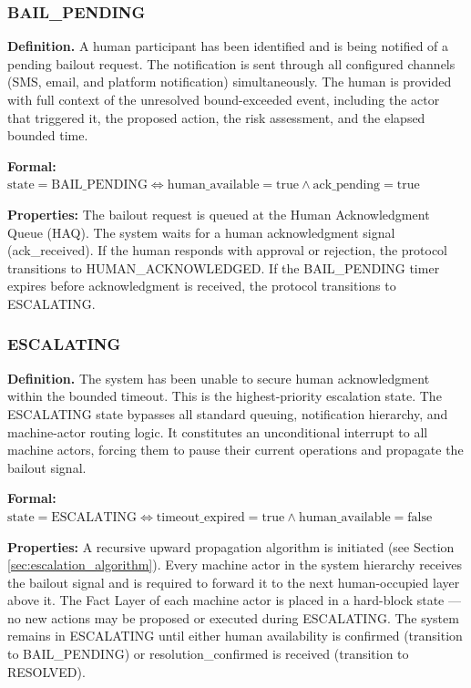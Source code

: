 \subsubsection{BAIL\_PENDING}

\textbf{Definition.} A human participant has been identified and is being notified of a pending bailout request. The notification is sent through all configured channels (SMS, email, and platform notification) simultaneously. The human is provided with full context of the unresolved bound-exceeded event, including the actor that triggered it, the proposed action, the risk assessment, and the elapsed bounded time.

\textbf{Formal:} $\text{state} = \text{BAIL\_PENDING} \Leftrightarrow \text{human\_available} = \text{true} \land \text{ack\_pending} = \text{true}$

\textbf{Properties:} The bailout request is queued at the Human Acknowledgment Queue (HAQ). The system waits for a human acknowledgment signal (ack\_received). If the human responds with approval or rejection, the protocol transitions to HUMAN\_ACKNOWLEDGED. If the BAIL\_PENDING timer expires before acknowledgment is received, the protocol transitions to ESCALATING.

\subsubsection{ESCALATING}

\textbf{Definition.} The system has been unable to secure human acknowledgment within the bounded timeout. This is the highest-priority escalation state. The ESCALATING state bypasses all standard queuing, notification hierarchy, and machine-actor routing logic. It constitutes an unconditional interrupt to all machine actors, forcing them to pause their current operations and propagate the bailout signal.

\textbf{Formal:} $\text{state} = \text{ESCALATING} \Leftrightarrow \text{timeout\_expired} = \text{true} \land \text{human\_available} = \text{false}$

\textbf{Properties:} A recursive upward propagation algorithm is initiated (see Section \ref{sec:escalation_algorithm}). Every machine actor in the system hierarchy receives the bailout signal and is required to forward it to the next human-occupied layer above it. The Fact Layer of each machine actor is placed in a hard-block state --- no new actions may be proposed or executed during ESCALATING. The system remains in ESCALATING until either human availability is confirmed (transition to BAIL\_PENDING) or resolution\_confirmed is received (transition to RESOLVED).

